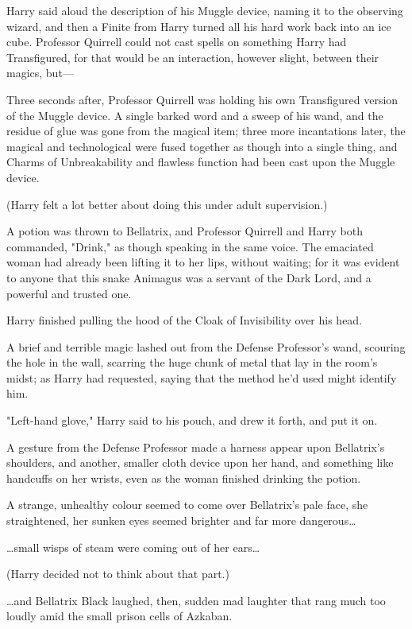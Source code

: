 Harry said aloud the description of his Muggle device, naming it to the
observing wizard, and then a Finite from Harry turned all his hard work back
into an ice cube. Professor Quirrell could not cast spells on something Harry
had Transfigured, for that would be an interaction, however slight, between
their magics, but---

Three seconds after, Professor Quirrell was holding his own Transfigured
version of the Muggle device. A single barked word and a sweep of his wand, and
the residue of glue was gone from the magical item; three more incantations
later, the magical and technological were fused together as though into a
single thing, and Charms of Unbreakability and flawless function had been cast
upon the Muggle device.

(Harry felt a lot better about doing this under adult supervision.)

A potion was thrown to Bellatrix, and Professor Quirrell and Harry both
commanded, "Drink," as though speaking in the same voice. The emaciated woman
had already been lifting it to her lips, without waiting; for it was evident to
anyone that this snake Animagus was a servant of the Dark Lord, and a powerful
and trusted one.

Harry finished pulling the hood of the Cloak of Invisibility over his head.

A brief and terrible magic lashed out from the Defense Professor's wand,
scouring the hole in the wall, scarring the huge chunk of metal that lay in the
room's midst; as Harry had requested, saying that the method he'd used might
identify him.

"Left-hand glove," Harry said to his pouch, and drew it forth, and put it on.

A gesture from the Defense Professor made a harness appear upon Bellatrix's
shoulders, and another, smaller cloth device upon her hand, and something like
handcuffs on her wrists, even as the woman finished drinking the potion.

A strange, unhealthy colour seemed to come over Bellatrix's pale face, she
straightened, her sunken eyes seemed brighter and far more dangerous{\ldots}

{\ldots}small wisps of steam were coming out of her ears{\ldots}

(Harry decided not to think about that part.)

{\ldots}and Bellatrix Black laughed, then, sudden mad laughter that rang much
too loudly amid the small prison cells of Azkaban.


